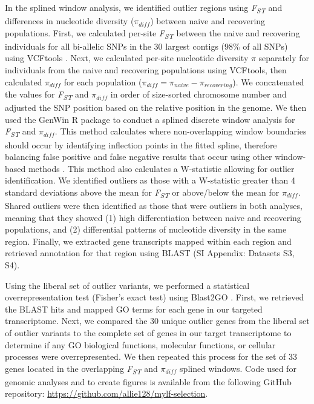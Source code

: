 \documentclass[9pt,twocolumn,twoside,lineno]{pnas-new}
\begin{document}
{In the splined window analysis, we identified outlier regions using
\emph{F\textsubscript{ST}} and differences in nucleotide diversity
(\(\pi_{diff}\)) between naive and recovering populations. First, we
calculated per-site \emph{F\textsubscript{ST}} between the naive and
recovering individuals for all bi-allelic SNPs in the 30 largest contigs
(98\% of all SNPs) using VCFtools \citep{danecek2011}. Next, we
calculated per-site nucleotide diversity \(\pi\) separately for
individuals from the naive and recovering populations using VCFtools,
then calculated \(\pi_{diff}\) for each population
(\(\pi_{diff} = \pi_{naive} - \pi_{recovering}\)). We concatenated the
values for \emph{F\textsubscript{ST}} and \(\pi_{diff}\) in order of
size-sorted chromosome number and adjusted the SNP position based on the
relative position in the genome. We then used the GenWin R package
\citep{beissinger2015} to conduct a splined discrete window analysis for
\emph{F\textsubscript{ST}} and \(\pi_{diff}\). This method calculates
where non-overlapping window boundaries should occur by identifying
inflection points in the fitted spline, therefore balancing false
positive and false negative results that occur using other window-based
methods \citep{beissinger2015}. This method also calculates a
W-statistic allowing for outlier identification. We identified outliers
as those with a W-statistic greater than 4 standard deviations above the
mean for \emph{F\textsubscript{ST}} or above/below the mean for
\(\pi_{diff}\). Shared outliers were then identified as those that were
outliers in both analyses, meaning that they showed (1) high
differentiation between naive and recovering populations, and (2)
differential patterns of nucleotide diversity in the same region.
Finally, we extracted gene transcripts mapped within each region and
retrieved annotation for that region using BLAST (SI Appendix: Datasets
S3, S4).

Using the liberal set of outlier variants, we performed a statistical
overrepresentation test (Fisher's exact test) using Blast2GO
\citep{conesa2005}. First, we retrieved the BLAST hits and mapped GO
terms for each gene in our targeted transcriptome. Next, we compared the
30 unique outlier genes from the liberal set of outlier variants to the
complete set of genes in our target transcriptome to determine if any GO
biological functions, molecular functions, or cellular processes were
overrepresented. We then repeated this process for the set of 33 genes
located in the overlapping \emph{F\textsubscript{ST}} and \(\pi_{diff}\)
splined windows. Code used for genomic analyses and to create figures is
available from the following GitHub repository:
\url{https://github.com/allie128/mylf-selection}.

}
\end{document}
